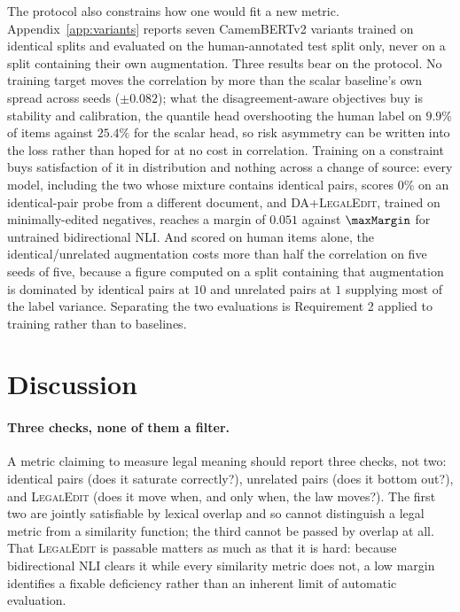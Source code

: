 \documentclass[11pt]{article}
\begin{document}
The protocol also constrains how one would fit a new metric.
Appendix~\ref{app:variants} reports seven CamemBERTv2 variants trained on
identical splits and evaluated on the human-annotated test split only, never on
a split containing their own augmentation. Three results bear on the protocol.
No training target moves the correlation by more than the scalar baseline's own
spread across seeds ($\pm0.082$); what the disagreement-aware objectives buy is
stability and calibration, the quantile head overshooting the human label on
$9.9\%$ of items against $25.4\%$ for the scalar head, so risk asymmetry can be
written into the loss rather than hoped for at no cost in correlation. Training
on a constraint buys satisfaction of it in distribution and nothing across a
change of source: every model, including the two whose mixture contains
identical pairs, scores $0\%$ on an identical-pair probe from a different
document, and \textsc{DA+LegalEdit}, trained on minimally-edited negatives,
reaches a margin of $0.051$ against $\maxMargin$ for untrained bidirectional
NLI. And scored on human items alone, the identical/unrelated augmentation costs
more than half the correlation on five seeds of five, because a figure computed
on a split containing that augmentation is dominated by identical pairs at $10$
and unrelated pairs at $1$ supplying most of the label variance. Separating the
two evaluations is Requirement 2 applied to training rather than to baselines.

\section{Discussion}
\label{sec:discussion}

\paragraph{Three checks, none of them a filter.}
A metric claiming to measure legal meaning should report three checks, not two:
identical pairs (does it saturate correctly?), unrelated pairs (does it bottom
out?), and \textsc{LegalEdit} (does it move when, and only when, the law moves?).
The first two are jointly satisfiable by lexical overlap and so cannot
distinguish a legal metric from a similarity function; the third cannot be
passed by overlap at all. That \textsc{LegalEdit} is passable matters as much as
that it is hard: because bidirectional NLI clears it while every similarity
metric does not, a low margin identifies a fixable deficiency rather than an
inherent limit of automatic evaluation.
\end{document}
